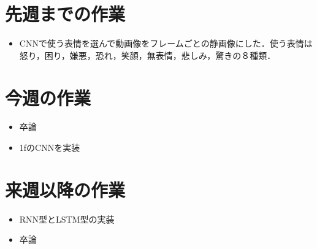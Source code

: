 \section{先週までの作業}
\begin{itemize}
 \item CNNで使う表情を選んで動画像をフレームごとの静画像にした．使う表情は怒り，困り，嫌悪，恐れ，笑顔，無表情，悲しみ，驚きの８種類．
\end{itemize}

\section{今週の作業}
\begin{itemize}
\item 卒論
\item 1fのCNNを実装
  
\end{itemize}

\section{来週以降の作業}
\begin{itemize}
\item RNN型とLSTM型の実装
  \item 卒論
\end{itemize}


